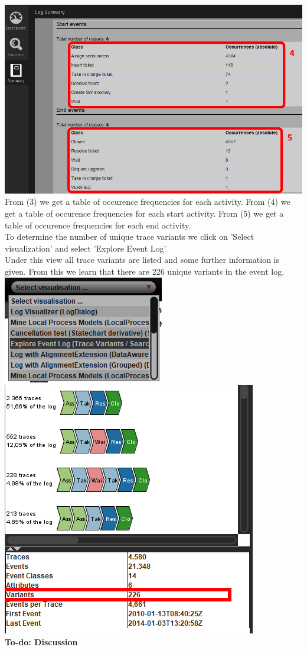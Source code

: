 \documentclass[../../main.tex]{subfiles}
\begin{document}
\includegraphics[width=0.8\columnwidth]{img/ProM_a_summary_2.png}\\
From (3) we get a table of occurence frequencies for each activity. From (4) we get a table of occurence frequencies for each start activity. From (5) we get a table of occurence frequencies for each end activity.\\
To determine the number of unique trace variants we click on 'Select visualization' and select 'Explore Event Log'\\
Under this view all trace variants are listed and some further information is given. From this we learn that there are 226 unique variants in the event log.\\
\includegraphics[width=0.5\columnwidth]{img/ProM_a_setting.png}\includegraphics[width=0.5\columnwidth]{img/ProM_a_traces.png}\\
\textbf{To-do: Discussion}
\end{document}

